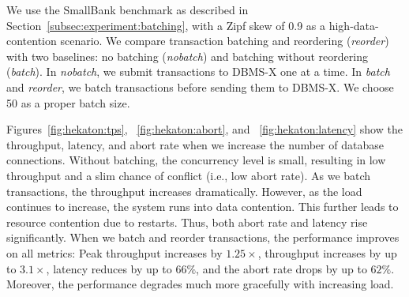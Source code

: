 We use the SmallBank benchmark as described in Section~\ref{subsec:experiment:batching}, with a Zipf skew of 0.9 as a high-data-contention scenario. We compare transaction batching and reordering (\emph{reorder}) with two baselines: no batching (\emph{nobatch}) and batching without reordering (\emph{batch}). In \emph{nobatch}, we submit transactions to DBMS-X one at a time. In \emph{batch} and \emph{reorder}, we batch transactions before sending them to DBMS-X. We choose 50 as a proper batch size.

Figures~\ref{fig:hekaton:tps}, ~\ref{fig:hekaton:abort}, and ~\ref{fig:hekaton:latency} show the throughput, latency, and abort rate when we increase the number of database connections. Without batching, the concurrency level is small, resulting in low throughput and a slim chance of conflict (i.e., low abort rate). 
As we batch transactions, the throughput increases dramatically. 
However, as the load continues to increase, the system runs into data contention. This further leads to resource contention due to restarts. Thus, both abort rate and latency rise significantly. When we batch and reorder transactions, the performance improves on all metrics: Peak throughput increases by $1.25\times$, throughput increases by up to $3.1\times$, latency reduces by up to $66\%$, and the abort rate drops by up to $62\%$.  Moreover, the performance degrades much more gracefully with increasing load.

